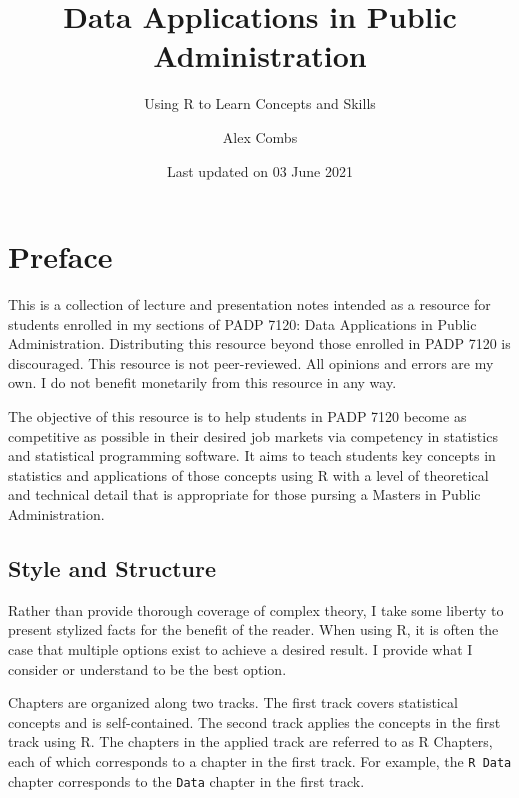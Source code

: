 \documentclass[
]{book}
\title{Data Applications in Public Administration}
\subtitle{Using R to Learn Concepts and Skills}
\author{Alex Combs}
\date{Last updated on 03 June 2021}
\begin{document}
\maketitle

\cleardoublepage\newpage
\thispagestyle{empty}

\setlength{\abovedisplayskip}{-5pt}
\setlength{\abovedisplayshortskip}{-5pt}

{
\hypersetup{linkcolor=}
\setcounter{tocdepth}{2}
\tableofcontents
}
\hypertarget{preface}{%
\chapter*{Preface}\label{preface}}


This is a collection of lecture and presentation notes intended as a resource for students enrolled in my sections of PADP 7120: Data Applications in Public Administration. Distributing this resource beyond those enrolled in PADP 7120 is discouraged. This resource is not peer-reviewed. All opinions and errors are my own. I do not benefit monetarily from this resource in any way.

The objective of this resource is to help students in PADP 7120 become as competitive as possible in their desired job markets via competency in statistics and statistical programming software. It aims to teach students key concepts in statistics and applications of those concepts using R with a level of theoretical and technical detail that is appropriate for those pursing a Masters in Public Administration.

\hypertarget{style-and-structure}{%
\section*{Style and Structure}\label{style-and-structure}}


Rather than provide thorough coverage of complex theory, I take some liberty to present stylized facts for the benefit of the reader. When using R, it is often the case that multiple options exist to achieve a desired result. I provide what I consider or understand to be the best option.

Chapters are organized along two tracks. The first track covers statistical concepts and is self-contained. The second track applies the concepts in the first track using R. The chapters in the applied track are referred to as R Chapters, each of which corresponds to a chapter in the first track. For example, the \texttt{R\ Data} chapter corresponds to the \texttt{Data} chapter in the first track.
\end{document}
